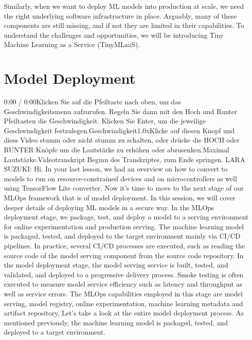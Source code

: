 {{{{{    Similarly, when we want to deploy ML models into production at scale, we need the right underlying software infrastructure in place. Arguably, many of these components are still missing, and if not they are limited in their capabilities. To understand the challenges and opportunities, we will be introducing Tiny Machine Learning as a Service (TinyMLaaS).        
        
 \section{Model Deployment}
 
     0:00 / 0:00Klicken Sie auf die Pfeiltaste nach oben, um das Geschwindigkeitsmenu aufzurufen. Regeln Sie dann mit den Hoch und Runter Pfeiltasten die Geschwindigkeit. Klicken Sie Enter, um die jeweilige Geschwindigkeit festzulegen.Geschwindigkeit1.0xKlicke auf diesen Knopf und diess Video stumm oder nicht stumm zu schalten, oder drücke die HOCH oder RUNTER Knöpfe um die Lautstärke zu erhöhen oder abzusenken.Maximal Lautstärke.Videotranskript
     Beginn des Transkriptes, zum Ende springen.
     LARA SUZUKI: Hi.
     In your last lesson, we had an overview on how
     to convert to models to run on resource-constrained devices
     and on microcontrollers as well using TensorFlow Lite converter.
     Now it's time to move to the next stage of our MLOps framework
     that is of model deployment.
     In this session, we will cover deeper details
     of deploying ML models in a secure way.
     In the MLOps deployment stage, we package, test, and deploy a model
     to a serving environment for online experimentation and production serving.
     The machine learning model is packaged, tested,
     and deployed to the target environment mainly via CI/CD pipelines.
     In practice, several CI/CD processes are executed,
     such as reading the source code of the model serving component
     from the source code repository.
     In the model deployment stage, the model serving service
     is built, tested, and validated, and deployed to a progressive delivery
     process.
     Smoke testing is often executed to measure
     model service efficiency such as latency and throughput
     as well as service errors.
     The MLOps capabilities employed in this stage
     are model serving, model registry, online experimentation,
     machine learning metadata and artifact repository.
     Let's take a look at the entire model deployment process.
     As mentioned previously, the machine learning model
     is packaged, tested, and deployed to a target environment.
}}}}}
